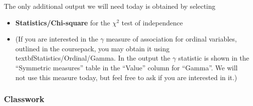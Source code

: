 
The only additional output we will need today is obtained by
selecting
\begin{itemize}
\item
\textbf{Statistics/Chi-square} for the $\chi^{2}$ test of
independence
\item
(If you are interested in the $\gamma$ measure of
association for ordinal variables, outlined in the coursepack,
you may obtain it using textbf{Statistics/Ordinal/Gamma}. In the output the
$\gamma$ statistic is shown in the ``Symmetric measures'' table in the
``Value'' column for ``Gamma''. We will not use this measure today, but
feel free to ask if you are interested in it.)
\end{itemize}



\subsubsection{Classwork}

